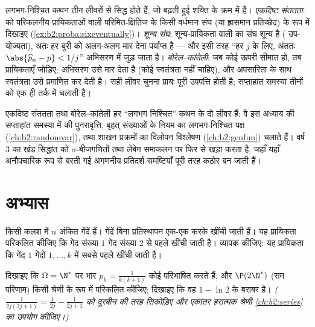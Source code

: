 \begin{remark}[विधि: प्रायिकता एक तक पहुँचने के तीन रास्ते]
लगभग-निश्चित कथन तीन लीवरों से सिद्ध होते हैं, जो बढ़ती हुई शक्ति
के क्रम में हैं। \emph{एकदिष्ट संततता}:  को परिकलनीय
प्रायिकताओं वाली परिमित-क्षितिज  के किसी वर्धमान संघ (या
ह्रासमान प्रतिच्छेद) के रूप में दिखाइए (\cref{ex:b2:proba:sixeventually})। \emph{शून्य संघ}:
शून्य-प्रायिकता वाली  का  संघ शून्य है (
उप-योज्यता), अतः हर बुरी  को अलग-अलग मार देना पर्याप्त है ---
और इसी तरह ``हर $j$ के लिए, अंततः $\abs{\widehat p_n - p} < 1/j$'' अभिसरण में जुड़ जाता है।
\emph{बोरेल--कांतेली}: जब  कोई ऊपरी सीमांत हो, तब प्रायिकताएँ
जोड़िए; अभिसरण उसे मार देता है (कोई स्वतंत्रता नहीं चाहिए), और
अपसारिता के साथ स्वतंत्रता उसे प्रमाणित कर देती है। सही लीवर चुनना
प्रायः पूरी उपपत्ति होती है; सप्ताहांत समस्या तीनों को एक ही तर्क
में चलाती है।
\end{remark}

\begin{remark}[यह कहाँ काम आता है]
एकदिष्ट संततता तथा बोरेल--कांतेली हर ``लगभग निश्चित'' कथन के दो
लीवर हैं: वे इस अध्याय की सप्ताहांत समस्या में 
की पुनरावृत्ति, बृहत् संख्याओं के नियम का लगभग-निश्चित पक्ष (\cref{ch:b2:randomvar}),
तथा शाखन प्रक्रमों का विलोपन विश्लेषण (\cref{ch:b2:genfun}) चलाते हैं। वर्ष 3 का
खंड सिद्धांत को $\sigma$-बीजगणितों तथा लेबेग समाकलन पर फिर से खड़ा करता
है, जहाँ यहाँ अनौपचारिक रूप से बरती गई अगणनीय प्रतिदर्श समष्टियाँ
पूरी तरह कठोर बन जाती हैं।
\end{remark}

\section{अभ्यास}

\begin{exercise}[$\star$]\label{exo:b2:proba:1}
किसी कलश में $n$ अंकित गेंदें हैं। गेंदें बिना प्रतिस्थापन एक-एक
करके खींची जाती हैं। यह प्रायिकता परिकलित कीजिए कि गेंद संख्या $1$
गेंद संख्या $2$ से पहले खींची जाती है। व्यापक कीजिए: यह प्रायिकता
कि गेंद $1$ गेंदों $1, \dots, k$ में सबसे पहले खींची जाती है।
\end{exercise}

\begin{exercise}[$\star$]\label{exo:b2:proba:2}
दिखाइए कि $\Omega = \N^*$ पर भार $p_k = \frac{1}{k(k+1)}$ कोई  परिभाषित करते हैं, और
$\P(2\N^*)$ (सम परिणाम) किसी श्रेणी के रूप में परिकलित कीजिए; दिखाइए कि वह
$1 - \ln 2$ के बराबर है। \emph{($\frac{1}{2j(2j+1)} = \frac{1}{2j} -
\frac{1}{2j+1}$ को दूरबीन की तरह सिकोड़िए और एकांतर
हरात्मक श्रेणी \cref{ch:b2:series} का उपयोग कीजिए।)}
\end{exercise}


